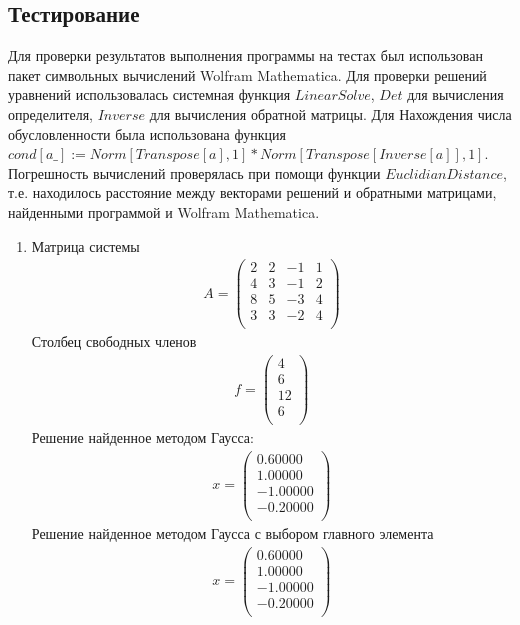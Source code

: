 \documentclass[a4paper,12pt,titlepage,finall]{article}
\begin{document}
\subsection{Тестирование}
Для проверки результатов выполнения программы на тестах был использован пакет символьных вычислений Wolfram Mathematica. Для проверки решений уравнений использовалась системная функция $LinearSolve$, $Det$ для вычисления определителя, $Inverse$ для вычисления обратной матрицы. Для Нахождения числа обусловленности была использована функция $cond[a\_] := Norm[Transpose[a], 1]*Norm[Transpose[Inverse[a]], 1]$. Погрешность вычислений проверялась при помощи функции $EuclidianDistance$, т.е. находилось расстояние между векторами решений и обратными матрицами, найденными программой и Wolfram Mathematica.
\begin{enumerate}
\item
Матрица системы
\begin{align*}
A = \begin{pmatrix}
2&  2&  -1&  1 \\
4&  3&  -1&  2 \\
8&  5&  -3&  4 \\
3&  3&  -2&  4 \\
\end{pmatrix}
\end{align*}
Столбец свободных членов
\begin{align*}
f = \begin{pmatrix}
4 \\
6 \\
12 \\
6 \\
\end{pmatrix}
\end{align*}
Решение найденное методом Гаусса:
\begin{align*}
x = \begin{pmatrix}
0.60000 \\
   1.00000 \\
  -1.00000 \\
  -0.20000 \\
\end{pmatrix}
\end{align*}
Решение найденное методом Гаусса с выбором главного элемента
\begin{align*}
x = \begin{pmatrix}
0.60000 \\
   1.00000 \\
  -1.00000 \\
  -0.20000 \\

\end{pmatrix}
\end{align*}
\end{enumerate}
\end{document}
